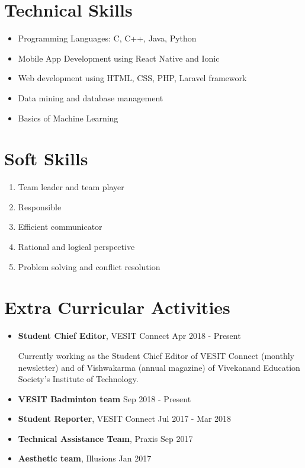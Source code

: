 \documentclass[margin]{res}
\begin{document}
\begin{resume}
\section{Technical Skills}
\begin{itemize}
  \item Programming Languages: C, C++, Java, Python
  \item Mobile App Development using React Native and Ionic
  \item Web development using HTML, CSS, PHP, Laravel framework
  \item Data mining and database management
  \item Basics of Machine Learning
\end{itemize}

\section{Soft Skills}
\begin{enumerate}
  \item Team leader and team player
  \item Responsible
  \item Efficient communicator
  \item Rational and logical perspective
  \item Problem solving and conflict resolution
\end{enumerate}

\section{Extra Curricular Activities}
\begin{itemize}
  \item {\bf Student Chief Editor}, VESIT Connect \hfill Apr 2018 - Present
  
  Currently working as the Student Chief Editor of VESIT Connect (monthly newsletter) and of Vishwakarma (annual magazine)  of Vivekanand Education Society's Institute of Technology. 
  \item {\bf VESIT Badminton team} \hfill Sep 2018 - Present
  \item {\bf Student Reporter}, VESIT Connect \hfill Jul 2017 - Mar 2018
  \item {\bf Technical Assistance Team}, Praxis \hfill Sep 2017
  \item {\bf Aesthetic team}, Illusions \hfill Jan 2017
\end{itemize}


\end{resume}
\end{document}
